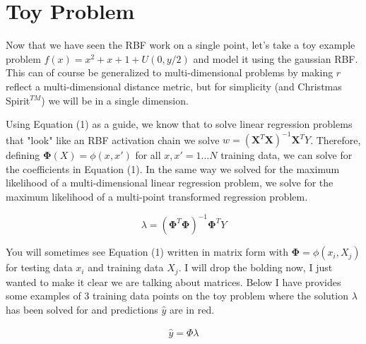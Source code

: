 \documentclass[12pt]{article}
\begin{document}
\section{Toy Problem}

Now that we have seen the RBF work on a single point, let's take a toy example problem $f(x)=x^2+x+1+U(0,y/2)$ and model it using the gaussian RBF. This can of course be generalized to multi-dimensional problems by making $r$ reflect a multi-dimensional distance metric, but for simplicity (and Christmas Spirit$^{TM}$) we will be in a single dimension. 

\vspace{5mm}

Using Equation (1) as a guide, we know that to solve linear regression problems that "look" like an RBF activation chain we solve $w=(\bm{X}^T \bm{X})^{-1}\bm{X}^T Y$. Therefore, defining $\bm{\Phi}(X) = \phi(x,x')$ for all $x,x'=1...N$ training data, we can solve for the coefficients in Equation (1). In the same way we solved for the maximum likelihood of a multi-dimensional linear regression problem, we solve for the maximum likelihood of a multi-point transformed regression problem. 

\begin{equation}
 \lambda=(\bm{\Phi}^T \bm{\Phi})^{-1}\bm{\Phi}^T Y
\end{equation}

\vspace{5mm}

You will sometimes see Equation (1) written in matrix form with $\bm{\Phi} = \phi(x_i,X_j)$ for testing data $x_i$ and training data $X_j$. I will drop the bolding now, I just wanted to make it clear we are talking about matrices. Below I have provides some examples of 3 training data points on the toy problem where the solution $\lambda$ has been solved for and predictions $\hat{y}$ are in red.

\begin{align*}
\hat{y}=\Phi \lambda
\end{align*}
\end{document}
